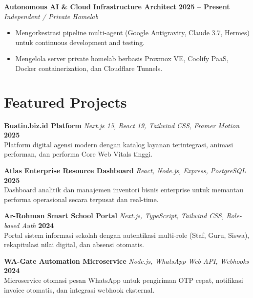 \documentclass[a4paper,10pt]{article}
\begin{document}
\vspace{4pt}

\textbf{Autonomous AI \& Cloud Infrastructure Architect} \hfill \color{subtext}\textbf{2025 -- Present}\\
\color{accent}\textit{Independent / Private Homelab} \color{black}
\begin{itemize}
    \item Mengorkestrasi pipeline multi-agent (Google Antigravity, Claude 3.7, Hermes) untuk continuous development and testing.
    \item Mengelola server private homelab berbasis Proxmox VE, Coolify PaaS, Docker containerization, dan Cloudflare Tunnels.
\end{itemize}

\section{Featured Projects}

\textbf{Buatin.biz.id Platform} \textbar{} \textit{Next.js 15, React 19, Tailwind CSS, Framer Motion} \hfill \color{subtext}\textbf{2025}\\
Platform digital agensi modern dengan katalog layanan terintegrasi, animasi performan, dan performa Core Web Vitals tinggi.

\vspace{3pt}

\textbf{Atlas Enterprise Resource Dashboard} \textbar{} \textit{React, Node.js, Express, PostgreSQL} \hfill \color{subtext}\textbf{2025}\\
Dashboard analitik dan manajemen inventori bisnis enterprise untuk memantau performa operasional secara terpusat dan real-time.

\vspace{3pt}

\textbf{Ar-Rohman Smart School Portal} \textbar{} \textit{Next.js, TypeScript, Tailwind CSS, Role-based Auth} \hfill \color{subtext}\textbf{2024}\\
Portal sistem informasi sekolah dengan autentikasi multi-role (Staf, Guru, Siswa), rekapitulasi nilai digital, dan absensi otomatis.

\vspace{3pt}

\textbf{WA-Gate Automation Microservice} \textbar{} \textit{Node.js, WhatsApp Web API, Webhooks} \hfill \color{subtext}\textbf{2024}\\
Microservice otomasi pesan WhatsApp untuk pengiriman OTP cepat, notifikasi invoice otomatis, dan integrasi webhook eksternal.
\end{document}
